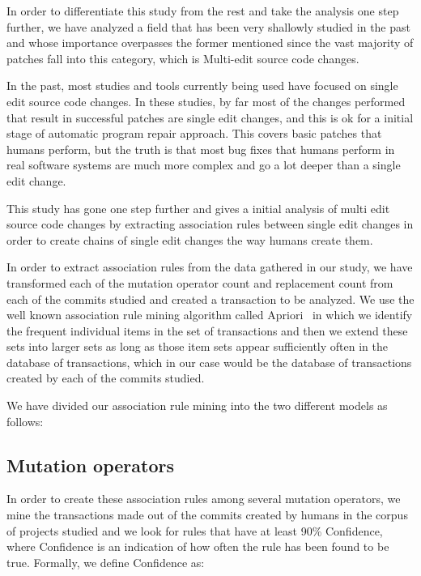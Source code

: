 \documentclass[conference]{IEEEtran}
\begin{document}
In order to differentiate this study from the rest and take the analysis one 
step further, we have analyzed a field that has been very shallowly studied in 
the past and whose importance overpasses the former mentioned since the vast 
majority of patches fall into this category, which is Multi-edit source code 
changes.

In the past, most studies and tools currently being used have focused on single 
edit source code changes. In these studies, by far most of the changes performed that result in 
successful patches are single edit changes, and this is ok for a initial stage 
of automatic program repair approach. This covers basic patches that humans 
perform, but the truth is that most bug fixes that humans perform in real 
software systems are much more complex and go a lot deeper than a single edit 
change. 

This study has gone one step further and gives a initial analysis of multi edit 
source code changes by extracting association rules between single edit changes 
in order to create chains of single edit changes the way humans create them.

In order to extract association rules from the data gathered in our study, we 
have transformed each of the mutation operator count and replacement count from 
each of the commits studied and created a transaction to be analyzed. We use the 
well known association rule mining algorithm called 
Apriori~\cite{Agrawal94,Liu98,Zaki2000} in which we identify the frequent 
individual items in the set of transactions and then we extend these sets into 
larger sets as long as those item sets appear sufficiently often in the database 
of transactions, which in our case would be the database of transactions created 
by each of the commits studied.

We have divided our association rule mining into the two different models as 
follows:


\subsection{Mutation operators}

In order to create these association rules among several mutation operators, we mine the transactions made out of the commits created by humans in the corpus of projects studied and we look for rules that have at least 90\% Confidence, where Confidence is an indication of how often the rule has been found to be true. 
Formally, we define Confidence as:
\end{document}
